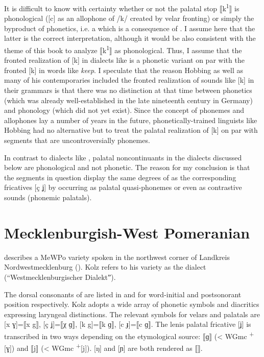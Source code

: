 It is difficult to know with certainty whether or not the palatal stop ⟦k\textsuperscript{1}⟧ is phonological ([c] as an allophone of /k/ created by velar fronting) or simply the byproduct of phonetics, i.e. a  which is a consequence of . I assume here that the latter is the correct interpretation, although it would be also consistent with the theme of this book to analyze ⟦k\textsuperscript{1}⟧ as phonological. Thus, I assume that the fronted realization of [k] in dialects like  is a phonetic variant on par with the fronted [k] in  words like \textit{keep}. I speculate that the reason Hobbing as well as many of his contemporaries included the fronted realization of sounds like [k] in their grammars is that there was no distinction at that time between phonetics (which was already well-established in the late nineteenth century in Germany) and phonology (which did not yet exist). Since the concept of phonemes and allophones lay a number of years in the future, phonetically-trained linguists like Hobbing had no alternative but to treat the palatal realization of [k] on par with segments that are uncontroversially phonemes.

In contrast to dialects like , palatal noncontinuants in the dialects discussed below are phonological and not phonetic. The reason for my conclusion is that the segments in question display the same degrees of  as the corresponding fricatives [ç ʝ] by occurring as palatal quasi-phonemes or even as contrastive sounds (phonemic palatals).

\section{{Mecklenburgish-West} {Pomeranian}}\label{sec:11.3}

\citet{Kolz1914} describes a MeWPo variety spoken in the northwest corner of Landkreis Nordwestmecklenburg (). Kolz refers to his variety as the  dialect (“Westmecklenburgischer Dialektˮ).

The dorsal consonants of  are listed in  and  for word-initial and postsonorant position respectively. Kolz adopts a wide array of phonetic symbols and diacritics expressing laryngeal distinctions. The relevant symbols for velars and palatals are [x ɣ]=⟦x g⟧, [ç ʝ]=⟦χ ɡ⟧, [k g]=⟦k ɡ⟧, [c ɟ]=⟦c ɡ⟧. The lenis palatal fricative [ʝ] is transcribed in two ways depending on the etymological source: ⟦ɡ⟧ (< WGmc \textsuperscript{+}[ɣ]) and ⟦j⟧ (< WGmc \textsuperscript{+}[j]). [ŋ] and [ɲ] are both rendered as ⟦⟧.

